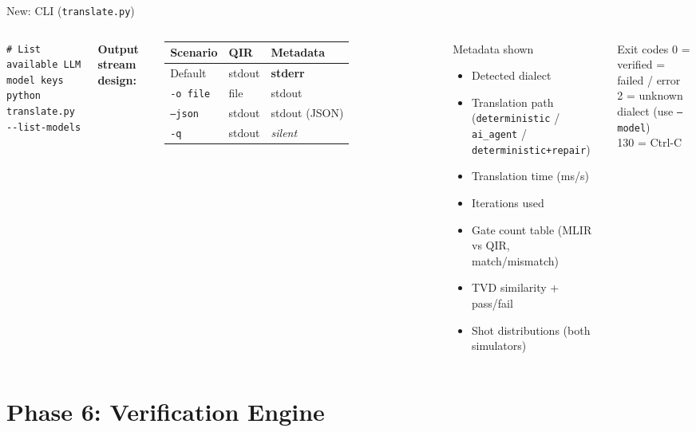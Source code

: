 \documentclass[aspectratio=169,10pt]{beamer}
\begin{document}
\begin{frame}[fragile]{New: CLI (\texttt{translate.py})}
\begin{columns}[T]
\begin{lstlisting}[style=pystyle]
# List available LLM model keys
python translate.py --list-models
      \end{lstlisting}
      \textbf{Output stream design:}
      \vspace{4pt}
      \begin{tabular}{@{}lp{1.6cm}p{1.6cm}@{}}
        \toprule
        Scenario & QIR & Metadata \\
        \midrule
        Default & stdout & \textbf{stderr}\\
        \texttt{-o file} & file & stdout \\
        \texttt{--json} & stdout & stdout (JSON) \\
        \texttt{-q} & stdout & \textit{silent} \\
        \bottomrule
      \end{tabular}
      \vspace{6pt}
      \begin{exampleblock}{Metadata shown}
        \scriptsize
        \begin{itemize}
          \item Detected dialect
          \item Translation path (\texttt{deterministic} / \texttt{ai\_agent} / \texttt{deterministic+repair})
          \item Translation time (ms/s)
          \item Iterations used
          \item Gate count table (MLIR vs QIR, match/mismatch)
          \item TVD similarity + pass/fail
          \item Shot distributions (both simulators)
        \end{itemize}
      \end{exampleblock}
      \vspace{4pt}
      \begin{block}{Exit codes}
        \scriptsize
        0 = verified \checkmark {} = failed / error\\
        2 = unknown dialect (use \texttt{--model})\\
        130 = Ctrl-C
      \end{block}
  \end{columns}
\end{frame}

\section{Phase 6: Verification Engine}
\end{document}
